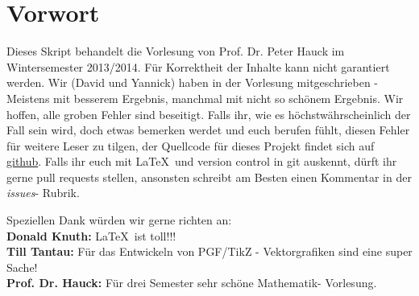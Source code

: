 \chapter*{Vorwort}
\thispagestyle{empty}

Dieses Skript behandelt die Vorlesung  von Prof. Dr. Peter
Hauck im Wintersemester 2013/2014. Für Korrektheit der Inhalte kann nicht
garantiert werden. Wir (David und Yannick) haben in der Vorlesung
mitgeschrieben - Meistens mit besserem Ergebnis, manchmal mit nicht so schönem
Ergebnis. Wir hoffen, alle groben Fehler sind beseitigt. Falls ihr, wie es
höchstwährscheinlich der Fall sein wird, doch etwas bemerken werdet und euch
berufen fühlt, diesen Fehler für weitere Leser zu tilgen, der Quellcode für
dieses Projekt findet sich auf \href{https://github.com/ryan91/MathIII}{github}.
Falls ihr euch mit \LaTeX\ und version control in git auskennt, dürft ihr gerne
pull requests stellen, ansonsten schreibt am Besten einen Kommentar in der
\textit{issues}- Rubrik.

Speziellen Dank würden wir gerne richten an:\\
\textbf{Donald Knuth:} \LaTeX\ ist toll!!!\\
\textbf{Till Tantau:} Für das Entwickeln von PGF/TikZ - Vektorgrafiken sind
eine super Sache!\\
\textbf{Prof. Dr. Hauck:} Für drei Semester sehr schöne Mathematik- Vorlesung.
